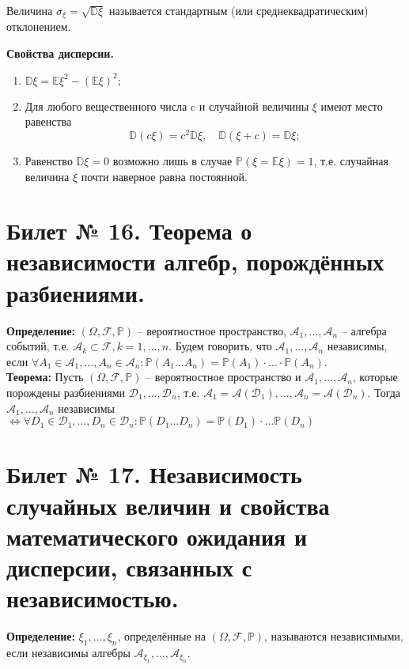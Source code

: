 	Величина $\sigma_{\xi} = \sqrt{\mathbb{D} \xi}$ называется стандартным (или среднеквадратическим) отклонением.
	
	\textbf{Свойства дисперсии.}
	\begin{enumerate}
	    \item $\mathbb{D} \xi = \mathbb{E} \xi^2 - (\mathbb{E}\xi)^2; $
	    \item Для любого вещественного числа c и случайной величины $\xi$  имеют место равенства \\
	\[
	\mathbb{D}(c\xi) = c^2\mathbb{D} \xi, \quad \mathbb{D} (\xi + c) = \mathbb{D} \xi ;
	\]
	    \item Равенство $\mathbb{D} \xi = 0$ возможно лишь в случае $\mathbb{P} (\xi = \mathbb{E} \xi) = 1$, т.е. случайная величина $\xi$ почти наверное равна постоянной.
	\end{enumerate}
	
	\section{Билет № 16. Теорема о независимости алгебр, порождённых разбиениями.}
	\hspace{\parindent}\textbf{Определение:} $(\Omega, \mathscr{F}, \mathbb{P})$ -- вероятностное пространство, $\mathscr{A}_1, \ldots, \mathscr{A}_n$ -- алгебра событий, т.е. $\mathscr{A}_k \subset \mathscr{F}, k = 1, \ldots, n$. Будем говорить, что $\mathscr{A}_1, \ldots, \mathscr{A}_n$ независимы, если $\forall A_1 \in \mathscr{A}_1, \ldots, A_n \in \mathscr{A}_n: \mathbb{P}(A_1 \ldots A_n) = \mathbb{P}(A_1) \cdot \ldots \cdot \mathbb{P}(A_n)$.\\
	
	\textbf{Теорема:} Пусть $(\Omega, \mathscr{F}, \mathbb{P})$ -- вероятностное пространство и $\mathscr{A}_1, \ldots, \mathscr{A}_n$, которые порождены разбиениями $\mathscr{D}_1, \ldots, \mathscr{D}_n$, т.е. $\mathscr{A}_1 = \mathscr{A}(\mathscr{D}_1), \ldots, \mathscr{A}_n = \mathscr{A}(\mathscr{D}_n)$. Тогда $\mathscr{A}_1, \ldots, \mathscr{A}_n$ независимы $\Leftrightarrow \forall D_1 \in \mathscr{D}_1, \ldots, D_n \in \mathscr{D}_n: \mathbb{P}(D_1 \ldots D_n) = \mathbb{P}(D_1) \cdot \ldots \mathbb{P}(D_n)$
	
	\section{Билет № 17. Независимость случайных величин и свойства математического ожидания и дисперсии, связанных с независимостью.}
	\hspace{\parindent} \textbf{Определение:} $\xi_1, \ldots, \xi_n$, определённые на $(\Omega, \mathscr{F}, \mathbb{P})$, называются независимыми, если независимы алгебры $\mathscr{A}_{\xi_1}, \ldots, \mathscr{A}_{\xi_n}$.\\
	
